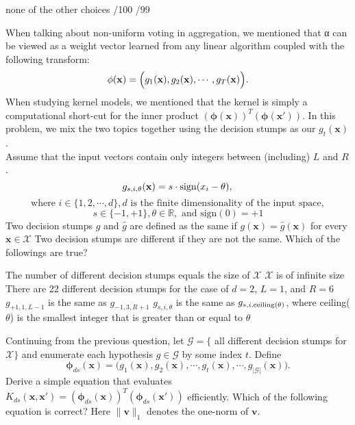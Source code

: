 \documentclass[a4paper,10pt]{exam}
\begin{document}
\begin{questions}
\begin{choices}
	\choice none of the other choices
	/100
	/99
	\\	
\end{choices}

\question When talking about non-uniform voting in aggregation, we mentioned that α can be viewed as a weight vector learned from any linear algorithm coupled with the following transform:
\[\mathbf{\phi}(\mathbf{x}) = \Bigl(g_1(\mathbf{x}), g_2(\mathbf{x}), \cdots, g_T(\mathbf{x})\Bigr).\]
When studying kernel models, we mentioned that the kernel is simply a computational short-cut for the inner product $(\mathbf{\phi}(\mathbf{x}))^T (\mathbf{\phi}(\mathbf{x}'))$. In this problem, we mix the two topics together using the decision stumps as our $g_t(\mathbf{x})$.\\
Assume that the input vectors contain only integers between (including) $L$ and $R$.
\[{g_{s,i,\theta }}({\bf{x}}) = s \cdot {\rm{sign}}({x_i} - \theta ),{\rm{ }}\]
\[{\mbox{where }}i \in \{ 1,2, \cdots ,d\} ,d{\mbox{ is the finite  dimensionality of the input space}},\]
\[s \in \{  - 1, + 1\} ,\theta  \in \mathbb{R} ,{\mbox{ and sign}}(0) =  + 1\]
Two decision stumps $g$ and $\hat{g}$ are defined as the same if $g(\mathbf{x}) = \hat{g}(\mathbf{x})$ for every $\mathbf{x} \in \mathcal{X}$ Two decision stumps are different if they are not the same. Which of the followings are true?\\
\begin{choices}
	\choice The number of different decision stumps equals the size of $\mathcal{X}$
	\choice $\mathcal{X}$ is of infinite size
	\CorrectChoice There are 22 different decision stumps for the case of $d=2$, $L=1$, and $R=6$
	\CorrectChoice $g_{+1, 1, L-1}$ is the same as $g_{-1, 3, R+1}$
	\CorrectChoice $g_{s, i, \theta}$ is the same as $g_{s, i, \rm{ceiling}(\theta)}$, where ceiling($\theta$) is the smallest integer that is greater than or equal to $\theta$
\end{choices}

\question Continuing from the previous question, let $\mathcal{G} = \{$ all different decision stumps for $\mathcal{X} \}$ and enumerate each hypothesis $g \in \mathcal{G}$ by some index $t$. Define
\[\mathbf{\phi}_{ds}(\mathbf{x}) = \Biggl(g_1(\mathbf{x}), g_2(\mathbf{x}), \cdots, g_t(\mathbf{x}), \cdots, g_{|\mathcal{G}|}(\mathbf{x})\Biggr).\]
Derive a simple equation that evaluates $K_{ds}(\mathbf{x}, \mathbf{x}') = (\mathbf{\phi}_{ds}(\mathbf{x}))^T (\mathbf{\phi}_{ds}(\mathbf{x}'))$ efficiently. Which of the following equation is correct? Here $\|\mathbf{v}\|_1$ denotes the one-norm of $\mathbf{v}$.


\end{questions}
\end{document}
